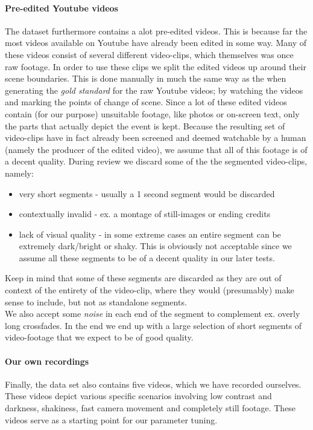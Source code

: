\paragraph{Pre-edited Youtube videos}
The dataset furthermore contains a alot pre-edited videos. This is because far the most videos available on Youtube have already been edited in some way. Many of these videos consist of several different video-clips, which themselves was once raw footage. In order to use these clips we split the edited videos up around their scene boundaries. This is done manually in much the same way as the when generating the \textit{gold standard} for the raw Youtube videos; by watching the videos and marking the points of change of scene. Since a lot of these edited videos contain (for our purpose) unsuitable footage, like photos or on-screen text, only the parts that actually depict the event is kept. Because the resulting set of video-clips have in fact already been screened and deemed watchable by a human (namely the producer of the edited video), we assume that all of this footage is of a decent quality. During review we discard some of the the segmented video-clips, namely:
%
\begin{itemize}
\item very short segments - usually a 1 second segment would be discarded
\item contextually invalid - ex. a montage of still-images or ending credits
\item lack of visual quality - in some extreme cases an entire segment can be extremely dark/bright or shaky. This is obviously not acceptable since we assume all these segments to be of a decent quality in our later tests.
\end{itemize}
%
Keep in mind that some of these segments are discarded as they are out of context of the entirety of the video-clip, where they would (presumably) make sense to include, but not as standalone segments.\\
We also accept some \textit{noise} in each end of the segment to complement ex. overly long crossfades. In the end we end up with a large selection of short segments of video-footage that we expect to be of good quality.
%
\paragraph{Our own recordings}
Finally, the data set also contains five videos, which we have recorded ourselves. These videos depict various specific scenarios involving low contrast and darkness, shakiness, fast camera movement and completely still footage. These videos serve as a starting point for our parameter tuning.
%
